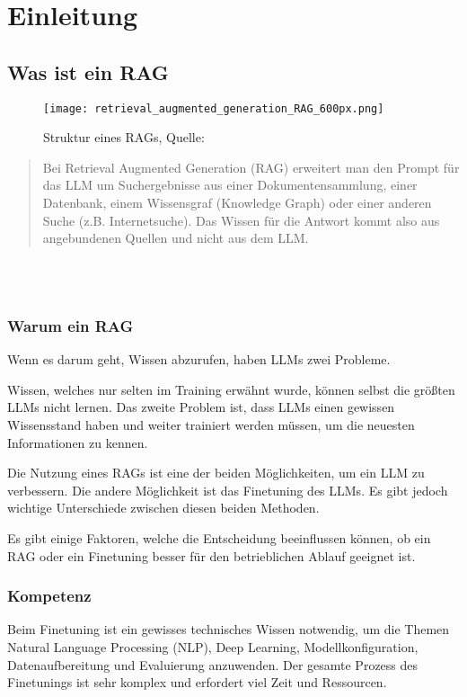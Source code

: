 \chapter{Einleitung}

\section{Was ist ein RAG}

\begin{figure}[h!]
    \centering
    \texttt{[image: retrieval\_augmented\_generation\_RAG\_600px.png]}
    \caption{Struktur eines RAGs, Quelle: \cite{honroth2024retrieval}}
    \label{fig:Rag Structure}
\end{figure}

\begin{quote}
    Bei Retrieval Augmented Generation (RAG) erweitert man den Prompt für das LLM um Suchergebnisse aus einer Dokumentensammlung, einer Datenbank, einem Wissensgraf (Knowledge Graph) oder einer anderen Suche (z.B. Internetsuche). Das Wissen für die Antwort kommt also aus angebundenen Quellen und nicht aus dem LLM.
\end{quote}
\cite{honroth2024retrieval}\\ \\

\subsection{Warum ein RAG}
Wenn es darum geht, Wissen abzurufen, haben LLMs zwei Probleme.

Wissen, welches nur selten im Training erwähnt wurde, können selbst die größten LLMs nicht lernen.
Das zweite Problem ist, dass LLMs einen gewissen Wissensstand haben und weiter trainiert werden müssen, um die neuesten Informationen zu kennen.

Die Nutzung eines RAGs ist eine der beiden Möglichkeiten, um ein LLM zu verbessern. Die andere Möglichkeit ist das Finetuning des LLMs. Es gibt jedoch wichtige Unterschiede zwischen diesen beiden Methoden.

Es gibt einige Faktoren, welche die Entscheidung beeinflussen können, ob ein RAG oder ein Finetuning besser für den betrieblichen Ablauf geeignet ist.

\subsection{Kompetenz}
Beim Finetuning ist ein gewisses technisches Wissen notwendig, um die Themen Natural Language Processing (NLP), Deep Learning, Modellkonfiguration, Datenaufbereitung und Evaluierung anzuwenden.
Der gesamte Prozess des Finetunings ist sehr komplex und erfordert viel Zeit und Ressourcen.

